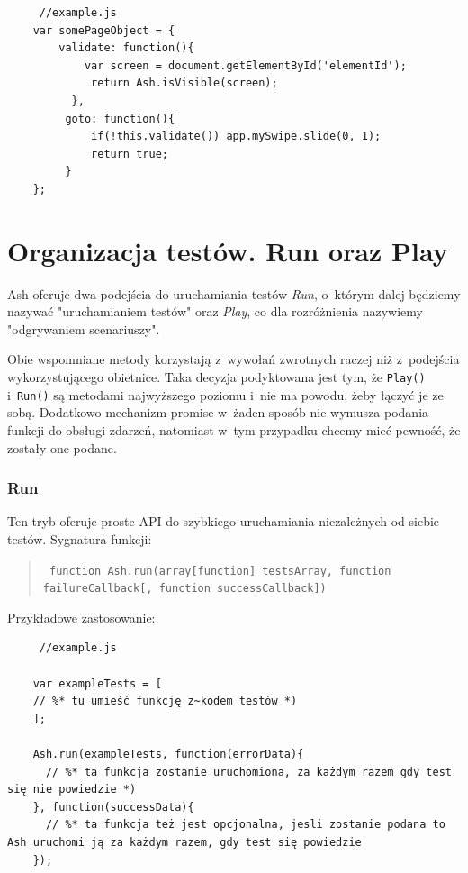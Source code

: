 \documentclass[brudnopis]{xmgr}
\begin{document}
\begin{lstlisting}
     //example.js
    var somePageObject = {
    	validate: function(){
      	    var screen = document.getElementById('elementId');
             return Ash.isVisible(screen);
          },
         goto: function(){
             if(!this.validate()) app.mySwipe.slide(0, 1);
             return true;
         }
    };
\end{lstlisting}

\section{Organizacja testów. Run oraz Play}

Ash oferuje dwa podejścia do uruchamiania testów \textit{Run}, o~którym dalej będziemy nazywać "uruchamianiem testów" oraz \textit{Play}, co dla rozróżnienia nazywiemy "odgrywaniem scenariuszy".

Obie wspomniane metody korzystają z~wywołań zwrotnych raczej niż z~podejścia wykorzystującego obietnice. Taka decyzja podyktowana jest tym, że \texttt{Play()} i~\texttt{Run()} są metodami najwyższego poziomu i~nie ma powodu, żeby łączyć je ze sobą. Dodatkowo mechanizm promise w~żaden sposób nie wymusza podania funkcji do obsługi zdarzeń, natomiast w~tym przypadku chcemy mieć pewność, że zostały one podane.  

\subsubsection{Run}

Ten tryb oferuje proste API do szybkiego uruchamiania niezależnych od siebie testów. Sygnatura funkcji: 

\begin{quote}
\texttt{ function Ash.run(array[function] testsArray, function failureCallback[, function successCallback]) }
\end{quote}

Przykładowe zastosowanie: 

\begin{lstlisting}
     //example.js

    var exampleTests = [
	// %* tu umieść funkcję z~kodem testów *)
    ];

    Ash.run(exampleTests, function(errorData){
      // %* ta funkcja zostanie uruchomiona, za każdym razem gdy test się nie powiedzie *)
    }, function(successData){
      // %* ta funkcja też jest opcjonalna, jesli zostanie podana to Ash uruchomi ją za każdym razem, gdy test się powiedzie
    });
\end{lstlisting}
\end{document}

